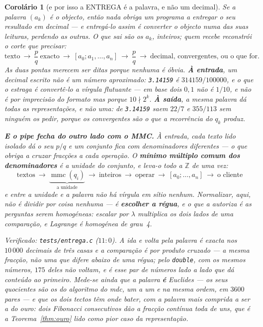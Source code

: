 \documentclass[11pt,a4paper]{article}
\newtheorem{corolario}[teorema]{Corolário}
\newcommand{\code}[1]{\texttt{\small #1}}
\begin{document}
\begin{corolario}[e por isso a ENTREGA é a palavra, e não um
decimal]\label{cor:entrega}
Se a palavra $(a_k)$ \emph{é} o objecto, então nada obriga um programa a
entregar o seu resultado em decimal --- e entregá-lo assim é converter o
objecto numa das suas leituras, perdendo as outras. O que sai são os
$a_k$, inteiros; quem recebe reconstrói o corte que precisar:
\[
\text{texto}\ \longrightarrow\ \frac{p}{q}\ \text{exacto}\ \longrightarrow\
[a_0;a_1,\ldots,a_n]\ \longrightarrow\ \frac{p}{q}\ \longrightarrow\
\text{decimal, convergentes, ou o que for.}
\]
As duas pontas merecem ser ditas porque nenhuma é óbvia. \textbf{À entrada},
um decimal escrito não é um número aproximado: \code{3.14159} \emph{é}
$314159/100000$, e o que o estraga é convertê-lo a vírgula flutuante --- em
base dois $0{,}1$ não é $1/10$, e não é por imprecisão do formato mas porque
$10\nmid 2^k$. \textbf{À saída}, a mesma palavra dá \emph{todas} as
representações, e não uma: de \code{3.14159} saem $22/7$ e $355/113$ sem
ninguém os pedir, porque os convergentes são o que a recorrência do
$q_k$ produz.

\textbf{E o pipe fecha do outro lado com o MMC.} À entrada, cada texto lido isolado dá o
seu $p/q$ e um conjunto fica com denominadores diferentes --- o que obriga a cruzar
fracções a cada operação. O \textbf{mínimo múltiplo comum dos denominadores} é a
\emph{unidade} do conjunto, e leva-o todo a $\mathbb{Z}$ de uma vez:
\[
\text{textos}\ \longrightarrow\ \underbrace{\operatorname{mmc}(q_i)}_{\text{a unidade}}\
\longrightarrow\ \text{inteiros}\ \longrightarrow\ \text{operar}\ \longrightarrow\
[a_0;\ldots,a_n]\ \longrightarrow\ \text{o cliente}
\]
\emph{e entre a unidade e a palavra não há vírgula em sítio nenhum}. Normalizar, aqui, não
é dividir por coisa nenhuma --- é \textbf{escolher a régua}, e o que a autoriza é as
perguntas serem homogéneas: escalar por $\lambda$ multiplica os dois lados de uma
comparação, e Lagrange é homogénea de grau~4.

\emph{Verificado:} \code{tests/entrega.c} ($11{:}0$). A ida e volta pela
palavra é exacta nos $10\,000$ decimais de três casas e a comparação é por
produto cruzado --- a \emph{mesma} fracção, não uma que difere abaixo de uma
régua; pelo \code{double}, com os mesmos números, $175$ deles não voltam, e
é esse par de números lado a lado que dá conteúdo ao primeiro. Mede-se
ainda que a palavra \textbf{é} Euclides --- os seus quocientes são os do
algoritmo do mdc, um a um e na mesma ordem, em $3600$ pares --- e que os
dois tectos têm onde bater, com a palavra mais comprida a ser a do ouro:
dois Fibonacci consecutivos dão a fracção contínua toda de uns, que é a
Teorema~\ref{thm:ouro} lido como \emph{pior caso da representação}.
\end{corolario}
\end{document}
